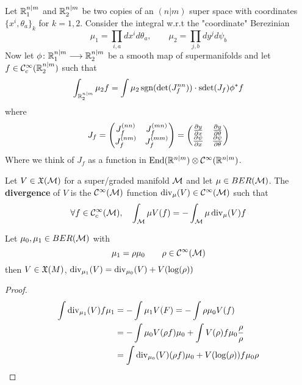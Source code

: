 \begin{rem}
  \begin{theo}
    Let $\mathbb{R}^{n|m}_1$ and $\mathbb{R}^{n|m}_2$ be two copies of an $(n|m)$ super space with coordinates $\{x^i, \theta_a\}_k$ for $k = 1,2$. Consider the integral w.r.t the "coordinate" Berezinian
    \begin{equation}
      \mu_1 = \prod_{i,a} dx^i d\theta_a, \quad \quad \mu_2 = \prod_{j,b} dy^j d\psi_b
    \end{equation}
    Now let $\phi \colon \RR^{n|m}_1 \lra \RR^{n|m}_2$ be a smooth map of supermanifolds and let $f \in \mathcal{C}^{\infty}_c(\mathbb{R}^{n|m}_2)$ such that
    $$ \int_{\RR^{n|m}_2} \mu_2 f = \int \mu_2 \sgn(\det(J_f^{nn})) \cdot \sdet(J_f) \phi^* f $$
    where
    \begin{align*}
    J_f =
    \begin{pmatrix}
      J_f^{(nn)} & J_f^{(mn)} \\
      J_f^{(nm)} & J_f^{(mm)}
    \end{pmatrix} =
    \begin{pmatrix}
      \frac{\partial y}{\partial x} & \frac{\partial y}{\partial \theta} \\
      \frac{\partial \psi}{\partial x} & \frac{\partial \psi}{\partial \theta}
    \end{pmatrix}
    \end{align*}
    Where we think of $J_f$ as a function in $\operatorname{End}(\mathbb{R}^{n|m}) \otimes \mathcal{C}^{\infty}(\mathbb{R}^{n|m})$.
  \end{theo}

  \begin{definition}
    Let $V \in \mathfrak{X}(\mathcal{M})$ for a super/graded manifold $\mathcal{M}$ and let $\mu \in BER(\mathcal{M})$. The \textbf{divergence} of $V$ is the $\mathcal{C}^{\infty}(\mathcal{M})$ function $\operatorname{div}_\mu(V) \in \mathcal{C}^{\infty}(\mathcal{M})$ such that
    $$ \forall f \in \mathcal{C}^{\infty}_c(\mathcal{M}), \quad \int_{\mathcal{M}} \mu V(f) = - \int_{\mathcal{M}} \mu \operatorname{div}_\mu(V) f$$
  \end{definition}

  \begin{lem}
    Let $\mu_0, \mu_1 \in BER(\mathcal{M})$ with
    $$ \mu_1 = \rho \mu_0 \quad \quad  \rho \in \mathcal{C}^{\infty}(\mathcal{M}) $$
    then $V \in \mathfrak{X}(M)$, $\operatorname{div}_{\mu_1}(V) = \operatorname{div}_{\mu_0}(V) + V(\log(\rho))$
  \begin{proof}~
    \begin{align}
      \int \operatorname{div}_{\mu_1}(V) f\mu_1 &= -\int \mu_1 V(F) = - \int \rho \mu_0 V(f)\\
      &= - \int \mu_0 V(\rho f) \mu_0 + \int V(\rho) f \mu_0 \frac{\rho}{\rho} \\
      &= \int \operatorname{div}_{\mu_0} (V) (\rho f) \mu_0 + V(\log(\rho)) f \mu_0 \rho
    \end{align}
  \end{proof}
  \end{lem}


\end{rem}
